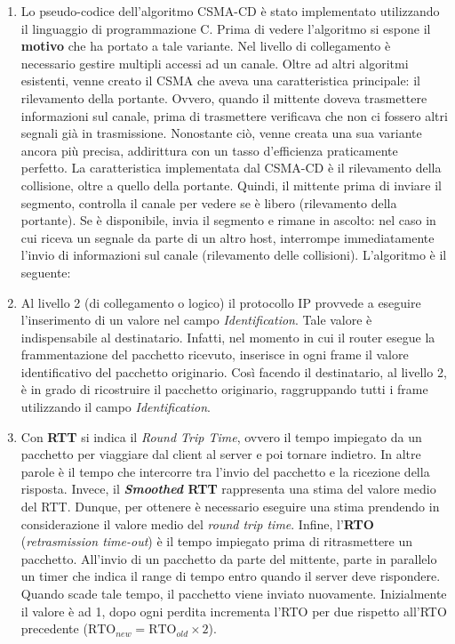 \documentclass[a4paper]{article}
\begin{document}
	\begin{enumerate}
		\item Lo pseudo-codice dell'algoritmo CSMA-CD è stato implementato utilizzando il linguaggio di programmazione C. Prima di vedere l'algoritmo si espone il \textbf{motivo} che ha portato a tale variante. Nel livello di collegamento è necessario gestire multipli accessi ad un canale. Oltre ad altri algoritmi esistenti, venne creato il CSMA che aveva una caratteristica principale: il rilevamento della portante. Ovvero, quando il mittente doveva trasmettere informazioni sul canale, prima di trasmettere verificava che non ci fossero altri segnali già in trasmissione.\newline
		Nonostante ciò, venne creata una sua variante ancora più precisa, addirittura con un tasso d'efficienza praticamente perfetto. La caratteristica implementata dal CSMA-CD è il rilevamento della collisione, oltre a quello della portante. Quindi, il mittente prima di inviare il segmento, controlla il canale per vedere se è libero (rilevamento della portante). Se è disponibile, invia il segmento e rimane in ascolto: nel caso in cui riceva un segnale da parte di un altro host, interrompe immediatamente l'invio di informazioni sul canale (rilevamento delle collisioni).\newpage
		L'algoritmo è il seguente:
		
		
		\item Al livello 2 (di collegamento o logico) il protocollo IP provvede a eseguire l'inserimento di un valore nel campo \emph{Identification}. Tale valore è indispensabile al destinatario. Infatti, nel momento in cui il router esegue la frammentazione del pacchetto ricevuto, inserisce in ogni frame il valore identificativo del pacchetto originario.\newline
		Così facendo il destinatario, al livello 2, è in grado di ricostruire il pacchetto originario, raggruppando tutti i frame utilizzando il campo \emph{Identification}.
		
		\item Con \textbf{RTT} si indica il \emph{Round Trip Time}, ovvero il tempo impiegato da un pacchetto per viaggiare dal client al server e poi tornare indietro. In altre parole è il tempo che intercorre tra l'invio del pacchetto e la ricezione della risposta. Invece, il \textbf{\emph{Smoothed} RTT} rappresenta una stima del valore medio del RTT. Dunque, per ottenere è necessario eseguire una stima prendendo in considerazione il valore medio del \emph{round trip time}.\newline
		Infine, l'\textbf{RTO} (\emph{retrasmission time-out}) è il tempo impiegato prima di ritrasmettere un pacchetto. All'invio di un pacchetto da parte del mittente, parte in parallelo un timer che indica il range di tempo entro quando il server deve rispondere. Quando scade tale tempo, il pacchetto viene inviato nuovamente. Inizialmente il valore è ad 1, dopo ogni perdita incrementa l'RTO per due rispetto all'RTO precedente ($\mathrm{RTO}_{new} = \mathrm{RTO}_{old} \times 2$).
	\end{enumerate}
	
\end{document}
